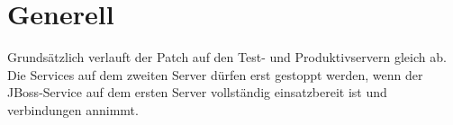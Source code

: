 
\chapter{Generell}
\begin{flushleft}
    Grundsätzlich verlauft der Patch auf den Test- und Produktivservern gleich ab.
    Die Services auf dem zweiten Server dürfen erst gestoppt werden, wenn der \Gls{JBoss}-Service auf dem ersten Server vollständig einsatzbereit ist und
    verbindungen annimmt.


\end{flushleft}
